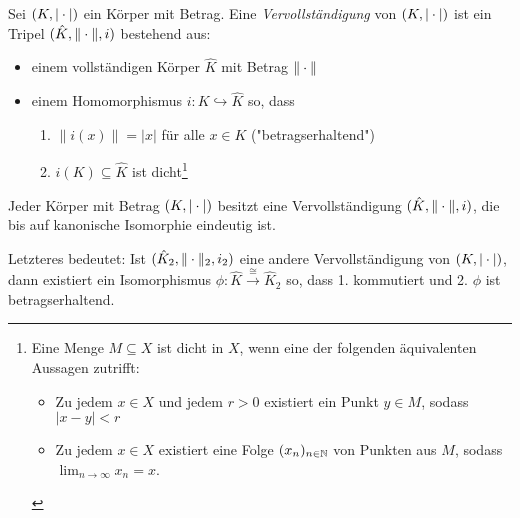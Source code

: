 \documentclass[../main.tex]{subfiles}
\begin{document}
\begin{definition}%
    Sei $(K,|\cdot|)$ ein Körper mit Betrag. Eine \emph{Vervollständigung} von $(K,|\cdot|)$ ist ein Tripel $(\hat{K},\|\cdot\|,i)$ bestehend aus:
    \begin{itemize}
        \item einem vollständigen Körper $\hat{K}$ mit Betrag $\|\cdot\|$
        \item einem Homomorphismus $i:K \hookrightarrow \hat{K}$ so, dass
        \begin{enumerate}
            \item $\|i(x)\| = |x|$ für alle $x\in K$ ("betragserhaltend")
            \item $i(K)\subseteq \hat{K}$ ist dicht\footnote{
            Eine Menge $M\subseteq X$ ist dicht in $X$, wenn eine der folgenden äquivalenten Aussagen zutrifft:
            \begin{itemize}
                \item Zu jedem $x\in X$ und jedem $r>0$ existiert ein Punkt $y\in M$, sodass $|x-y|<r$
                \item Zu jedem $x\in X$ existiert eine Folge $(x_n)_{n\in\mathbb{N}}$ von Punkten aus $M$, sodass $\lim_{n\rightarrow\infty} x_n = x$.
            \end{itemize}
            }
        \end{enumerate}
    \end{itemize}
\end{definition}

\begin{theorem}
    Jeder Körper mit Betrag $(K,|\cdot|)$ besitzt eine Vervollständigung $(\hat{K}, \|\cdot\|,i)$, die bis auf kanonische Isomorphie eindeutig ist.
\end{theorem}
Letzteres bedeutet:
Ist $(\hat{K}_2, \|\cdot\|_2,i_2)$ eine andere Vervollständigung von $(K,|\cdot|)$, dann existiert ein Isomorphismus $\phi:\hat{K}\overset{\cong}{\rightarrow} \hat{K}_2$ so, dass 1. \TODO[Bild] kommutiert und 2. $\phi$ ist betragserhaltend.
\end{document}
